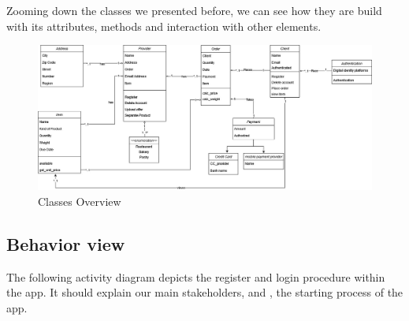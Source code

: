 



\newpage
\thispagestyle{lscape}
\begin{landscape}

Zooming down the classes we presented before, we can see how they are build with its attributes, methods and
interaction with other elements.

\begin{figure}[H]
    \centering
    \includegraphics[width=1.5\textwidth]{assets/classes_CD.jpg}
    \caption{Classes Overview}
    \label{fig:class_CD}
\end{figure}

\end{landscape}

\subsection{Behavior view}

The following \gls{activity diagram} depicts the register and login procedure within the app. It should explain our
main stakeholders,  and , the starting process of the app.

